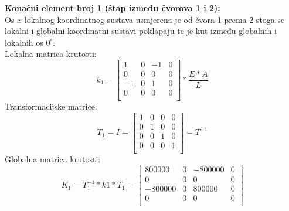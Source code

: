 \documentclass[a4paper,twoside,12pt]{memoir} %
\begin{document}
\textbf{Konačni element broj 1 (štap između čvorova 1 i 2):} \\
Os $x$ lokalnog koordinatnog sustava usmjerena je od čvora 1 prema 2 stoga se lokalni i globalni koordinatni sustavi poklapaju te je kut između globalnih i lokalnih os $0^\circ$. \\
Lokalna matrica krutosti:
\begin{equation}
    k_1 = 
    \begin{bmatrix}
    1 & 0 & -1 & 0 \\
    0 & 0 & 0 & 0 \\
    -1 & 0 & 1 & 0 \\
    0 & 0 & 0 & 0 \\
    \end{bmatrix} * \frac{E * A}{L}
\end{equation}
Transformacijske matrice:
\begin{equation}
    T_1 = I =
    \begin{bmatrix}
    1 & 0 & 0 & 0 \\
    0 & 1 & 0 & 0 \\
    0 & 0 & 1 & 0 \\
    0 & 0 & 0 & 1 \\
    \end{bmatrix} = T^{-1}
\end{equation}
Globalna matrica krutosti:
\begin{equation}
    K_1 = T^{-1}_1 * k1 * T_1 =
    \begin{bmatrix}
    800000 & 0 & -800000 & 0 \\
    0 & 0 & 0 & 0 \\
    -800000 & 0 & 800000 & 0 \\
    0 & 0 & 0 & 0 \\
    \end{bmatrix}
\end{equation}
\end{document}
